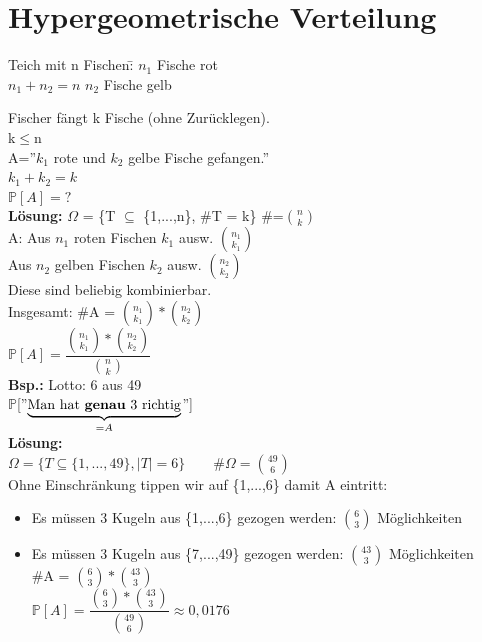 \section{Hypergeometrische Verteilung}
\begin{tabbing}
	Teich mit n Fischen:\hspace{1cm}\= $n_1$ Fische rot\\
	$n_1 + n_2 = n$ \>$n_2$ Fische gelb
\end{tabbing}
Fischer fängt k Fische (ohne Zurücklegen).\\
k$\leq$n\medskip\\
A=''$k_1$ rote und $k_2$ gelbe Fische gefangen.''\\
$k_1 + k_2 = k$\medskip\\
$\mathds{P}[A] = ?$\smallskip\\
\textbf{Lösung:} $\Omega$ = \{T $\subseteq$ \{1,...,n\}, \#T = k\}\hspace{5mm} \#=$\binom{n}{k}$\medskip\\
A: Aus $n_1$ roten Fischen $k_1$ ausw. $\binom{n_1}{k_1}$\\
Aus $n_2$ gelben Fischen $k_2$ ausw. $\binom{n_2}{k_2}$\\
Diese sind beliebig kombinierbar.\\
Insgesamt: \#A = $\binom{n_1}{k_1}*\binom{n_2}{k_2}$\\
$\mathds{P}[A] = \dfrac{\binom{n_1}{k_1}*\binom{n_2}{k_2}}{\binom{n}{k}}$\medskip\\
\textbf{Bsp.:} Lotto: 6 aus 49\\
$\mathds{P}$[''$\underbrace{\text{Man hat \textbf{genau} 3 richtig}}_{=A}$'']\\
\textbf{Lösung:}\\
$\Omega = \{T \subseteq \{1,...,49\},|T| = 6\} \qquad \#\Omega = \binom{49}{6}$\\
 Ohne Einschränkung tippen wir auf \{1,...,6\} damit A eintritt:
\begin{itemize}
\item Es müssen 3 Kugeln aus \{1,...,6\} gezogen werden: $\binom{6}{3}$ Möglichkeiten
\item Es müssen 3 Kugeln aus \{7,...,49\} gezogen werden: $\binom{43}{3}$ Möglichkeiten\\
\#A = $\binom{6}{3}*\binom{43}{3}$\smallskip\\
$\mathds{P}[A] = \dfrac{\binom{6}{3}*\binom{43}{3}}{\binom{49}{6}}\approx 0,0176$
\end{itemize}
